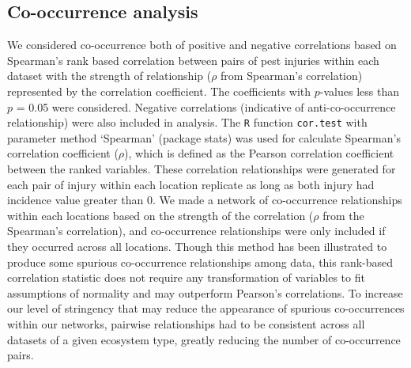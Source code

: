 \subsection*{Co-occurrence analysis}

We considered co-occurrence both of positive and negative correlations based on Spearman's rank based correlation between pairs of pest injuries within each dataset with the strength of relationship ($\rho$ from Spearman's correlation) represented by the correlation coefficient. The coefficients with $p$-values less than $p$ = 0.05 were considered. Negative correlations (indicative of anti-co-occurrence relationship) were also included in analysis. The \texttt{R} function \texttt{cor.test} with parameter method `Spearman' (package stats) \cite{R_2015} was used for calculate Spearman's correlation coefficient ($\rho$), which is defined as the Pearson correlation coefficient between the ranked variables.
These correlation relationships were generated for each pair of injury within each location replicate as long as both injury had incidence value greater than 0. We made a network of co-occurrence relationships within each locations based on the strength of the correlation ($\rho$ from the Spearman's correlation), and co-occurrence relationships were only included if they occurred across all locations. Though this method has been illustrated to produce some spurious co-occurrence relationships among data, this rank-based correlation statistic does not require any transformation of variables to fit assumptions of normality and may outperform Pearson’s correlations. To increase our level of stringency that may reduce the appearance of spurious co-occurrences within our networks, pairwise relationships had to be consistent across all datasets of a given ecosystem type, greatly reducing the number of co-occurrence pairs.
